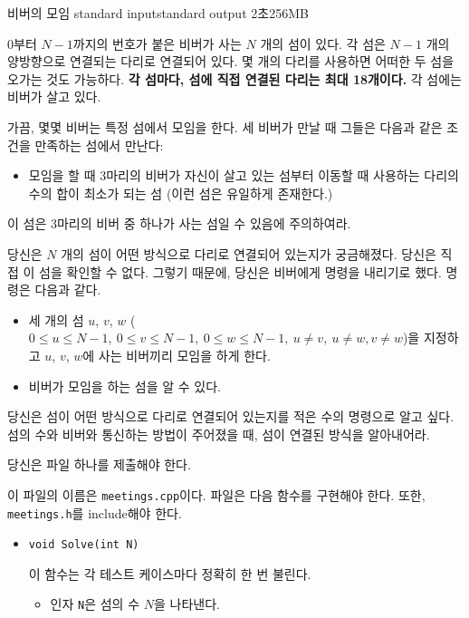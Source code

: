 \begin{problem}{비버의 모임}
	{standard input}{standard output}
	{2초}{256MB}{}
	
	0부터 $N-1$까지의 번호가 붙은 비버가 사는 $N$ 개의 섬이 있다. 각 섬은 $N-1$ 개의 양방향으로 연결되는 다리로 연결되어 있다. 몇 개의 다리를 사용하면 어떠한 두 섬을 오가는 것도 가능하다. \textbf{각 섬마다, 섬에 직접 연결된 다리는 최대 18개이다.} 각 섬에는 비버가 살고 있다.
	
	가끔, 몇몇 비버는 특정 섬에서 모임을 한다. 세 비버가 만날 때 그들은 다음과 같은 조건을 만족하는 섬에서 만난다:
	
	\begin{itemize}
	\item 모임을 할 때 3마리의 비버가 자신이 살고 있는 섬부터 이동할 때 사용하는 다리의 수의 합이 최소가 되는 섬 (이런 섬은 유일하게 존재한다.)
	\end{itemize}
	
	이 섬은 3마리의 비버 중 하나가 사는 섬일 수 있음에 주의하여라.
	
	당신은 $N$ 개의 섬이 어떤 방식으로 다리로 연결되어 있는지가 궁금해졌다. 당신은 직접 이 섬을 확인할 수 없다. 그렇기 때문에, 당신은 비버에게 명령을 내리기로 했다. 명령은 다음과 같다.
	
	\begin{itemize}
		\item 세 개의 섬 $u$, $v$, $w$ ($0 \le u \le N-1,\ 0 \le v \le N-1, \ 0 \le w \le N-1, \ u \ne v, \ u \ne w , v \ne w$)을 지정하고 $u$, $v$, $w$에 사는 비버끼리 모임을 하게 한다.
		\item 비버가 모임을 하는 섬을 알 수 있다.
	\end{itemize}

	당신은 섬이 어떤 방식으로 다리로 연결되어 있는지를 적은 수의 명령으로 알고 싶다. 섬의 수와 비버와 통신하는 방법이 주어졌을 때, 섬이 연결된 방식을 알아내어라.
	
	
	\Specification
	
	당신은 파일 하나를 제출해야 한다.
	
	이 파일의 이름은 \texttt{meetings.cpp}이다. 파일은 다음 함수를 구현해야 한다. 또한, \texttt{meetings.h}를 include해야 한다.
	
	\begin{itemize}
		\item \texttt{void Solve(int N)}
		
		이 함수는 각 테스트 케이스마다 정확히 한 번 불린다.
		\begin{itemize}
			\item 인자 \texttt{N}은 섬의 수 $N$을 나타낸다.
		\end{itemize}
	

\end{itemize}
\end{problem}
